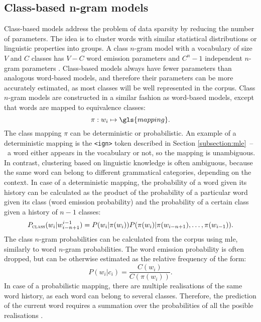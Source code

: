 	\subsection{Class-based n-gram models}
	\label{subsection:class}
	Class-based models address the problem of data sparsity by reducing the number of parameters. The idea is to cluster words with similar statistical distributions or linguistic properties into groups. A class \mbox{$n$-gram} model with a vocabulary of size $V$ and $C$ classes has $V-C$ word emission parameters and $C^{n}-1$ independent \mbox{$n$-gram} parameters \cite{brown1992class}. Class-based models always have fewer parameters than analogous word-based models, and therefore their parameters can be more accurately estimated, as most classes will be well represented in the corpus. Class \mbox{$n$-gram} models are constructed in a similar fashion as word-based models, except that words are mapped to equivalence classes: 
	\begin{equation}
		\pi:w_{i}\mapsto \gls{mapping}.
		\label{equation:deterministic_class}
	\end{equation}
	The class mapping $\pi$ can be deterministic or probabilistic. An example of a deterministic mapping is the \texttt{<ign>} token described in Section \ref{subsection:mle}~--~a word either appears in the vocabulary or not, so the mapping is unambiguous. In contrast, clustering based on linguistic knowledge is often ambiguous, because the same word can belong to different grammatical categories, depending on the context. 
	In case of a deterministic mapping, the probability of a word given its history can be calculated as the product of the probability of a particular word given its class (word emission probability) and the probability of a certain class given a history of $n-1$ classes:
	\begin{equation}
		P_{\textsc{class}}(w_{i}|w_{i-n+1}^{i-1})=P(w_{i}|\pi(w_{i}))P(\pi(w_{i})|\pi(w_{i-n+1}), \dots, \pi(w_{i-1})).
		\label{equation:classngram}
	\end{equation}
	The class \mbox{$n$-gram} probabilities can be calculated from the corpus using \gls{mle}, similarly to word \mbox{$n$-gram} probabilities. The word emission probability is often dropped, but can be otherwise estimated as the relative frequency of the form:
	\begin{equation}
		P(w_{i}|c_{i})=\frac{C(w_{i})}{C(\pi(w_{i}))}.
		\label{equation:emission_probability}
	\end{equation}
	In case of a probabilistic mapping, there are multiple realisations of the same word history, as each word can belong to several classes. Therefore, the prediction of the current word requires a summation over the probabilities of all the posible realisations \cite{ney1994structuring}.
